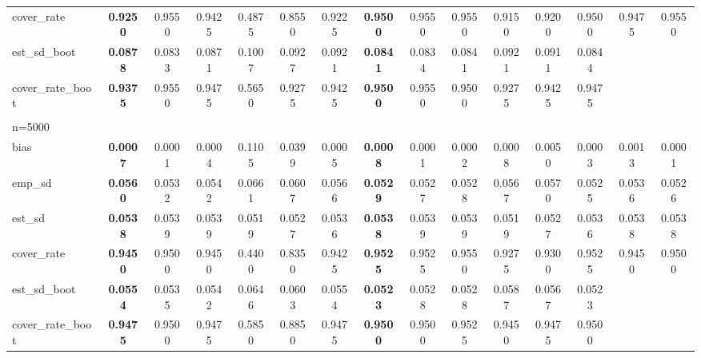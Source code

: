 \documentclass[11pt]{article}
\numberwithin{equation}{section}
\begin{document}
\begin{table}[]
{\begin{tabular}{lcccccccccccccc}
			cover\_rate & \textbf{0.9250} & 0.9550 & 0.9425 & 0.4875 & 0.8550 & 0.9225 & \textbf{0.9500} & 0.9550 & 0.9550 & 0.9150 & 0.9200 & 0.9500 & 0.9475 & 0.9550 \\
			est\_sd\_boot & \textbf{0.0878} & 0.0833 & 0.0871 & 0.1007 & 0.0927 & 0.0921 & \textbf{0.0841} & 0.0834 & 0.0841 & 0.0921 & 0.0911 & 0.0844 &  &  \\
			cover\_rate\_boot & \textbf{0.9375} & 0.9550 & 0.9475 & 0.5650 & 0.9275 & 0.9425 & \textbf{0.9500} & 0.9550 & 0.9500 & 0.9275 & 0.9425 & 0.9475 &  &  \\
			\\
			n=5000 &  &  &  &  &  &  &  &  &  &  &  &  &  &  \\
			\hline
			bias & \textbf{0.0007} & 0.0001 & 0.0004 & 0.1105 & 0.0399 & 0.0005 & \textbf{0.0008} & 0.0001 & 0.0002 & 0.0008 & 0.0050 & 0.0003 & 0.0013 & 0.0001 \\
			emp\_sd & \textbf{0.0560} & 0.0532 & 0.0542 & 0.0661 & 0.0607 & 0.0566 & \textbf{0.0529} & 0.0527 & 0.0528 & 0.0567 & 0.0570 & 0.0525 & 0.0536 & 0.0526 \\
			est\_sd & \textbf{0.0538} & 0.0539 & 0.0539 & 0.0519 & 0.0527 & 0.0536 & \textbf{0.0538} & 0.0539 & 0.0539 & 0.0519 & 0.0527 & 0.0536 & 0.0538 & 0.0538 \\
			cover\_rate & \textbf{0.9450} & 0.9500 & 0.9450 & 0.4400 & 0.8350 & 0.9425 & \textbf{0.9525} & 0.9525 & 0.9550 & 0.9275 & 0.9300 & 0.9525 & 0.9450 & 0.9500 \\
			est\_sd\_boot & \textbf{0.0554} & 0.0535 & 0.0542 & 0.0646 & 0.0603 & 0.0554 & \textbf{0.0523} & 0.0528 & 0.0528 & 0.0587 & 0.0567 & 0.0523 &  &  \\
			cover\_rate\_boot & \textbf{0.9475} & 0.9500 & 0.9475 & 0.5850 & 0.8850 & 0.9475 & \textbf{0.9500} & 0.9500 & 0.9525 & 0.9450 & 0.9475 & 0.9500 &  & \\
			\hline
		\end{tabular}
		\label{tab:simu_average_ate_p5_2}}
\end{table}
\end{document}
